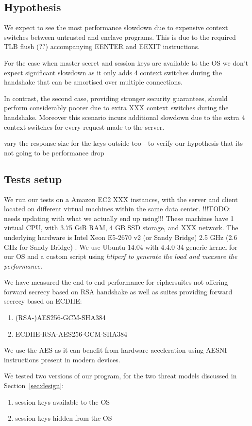 \documentclass[../main.tex]{subfiles}
\begin{document}
\subsection{Hypothesis}
We expect to see the most performance slowdown due to expensive context
switches between untrusted and enclave programs. This is due to the required
TLB flush (??) accompanying EENTER and EEXIT instructions.

For the case when master secret and session keys are available to the OS we
don't expect significant slowdown as it only adds 4 context switches during
the handshake that can be amortised over multiple connections.

In contrast, the second case, providing stronger security guarantees, should
perform considerably poorer due to extra XXX context switches during the
handshake. Moreover this scenario incurs additional slowdown due to the extra
4 context switches for every request made to the server.

vary the response size for the keys outside too - to verify our hypothesis
that its not going to be performance drop

\subsection{Tests setup}
We run our tests on a Amazon EC2 XXX instances, with the server and
client located on different virtual machines within the same data center.
!!!TODO: needs updating with what we actually end up using!!! These machines
have 1 virtual CPU, with 3.75 GiB RAM, 4 GB SSD storage, and XXX network. The
underlying hardware is Intel Xeon E5-2670 v2 (or Sandy Bridge) 2.5 GHz
(2.6 GHz for Sandy Bridge) \cite{aws_instances}. We use Ubuntu 14.04 with 
4.4.0-34 generic kernel for our OS and a custom script using \it{httperf} to
generate the load and measure the performance.

We have measured the end to end performance for ciphersuites not offering
forward secrecy based on RSA handshake as well as suites providing forward
secrecy based on ECDHE:
\begin{enumerate}
  \item (RSA-)AES256-GCM-SHA384
  \item ECDHE-RSA-AES256-GCM-SHA384
\end{enumerate}

We use the AES as it can benefit from hardware acceleration using AESNI
instructions present in modern devices.

We tested two versions of our program, for the two threat models discussed in
Section~\ref{sec:design}:
\begin{enumerate}
  \item session keys available to the OS
  \item session keys hidden from the OS
\end{enumerate}
\end{document}
